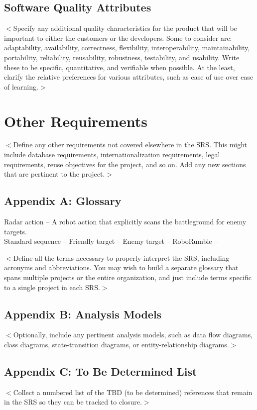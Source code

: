 \documentclass{scrreprt}
\begin{document}
\section{Software Quality Attributes}
$<$Specify any additional quality characteristics for the product that will be 
important to either the customers or the developers. Some to consider are: 
adaptability, availability, correctness, flexibility, interoperability, 
maintainability, portability, reliability, reusability, robustness, testability, 
and usability. Write these to be specific, quantitative, and verifiable when 
possible. At the least, clarify the relative preferences for various attributes, 
such as ease of use over ease of learning.$>$

\chapter{Other Requirements}
$<$Define any other requirements not covered elsewhere in the SRS. This might 
include database requirements, internationalization requirements, legal 
requirements, reuse objectives for the project, and so on. Add any new sections 
that are pertinent to the project.$>$

\section{Appendix A: Glossary}

Radar action -- A robot action that explicitly scans the battleground for enemy targets.\\
Standard sequence --
Friendly target --
Enemy target --
RoboRumble --

$<$Define all the terms necessary to properly interpret the SRS, including 
acronyms and abbreviations. You may wish to build a separate glossary that spans 
multiple projects or the entire organization, and just include terms specific to 
a single project in each SRS.$>$

\section{Appendix B: Analysis Models}
$<$Optionally, include any pertinent analysis models, such as data flow 
diagrams, class diagrams, state-transition diagrams, or entity-relationship 
diagrams.$>$

\section{Appendix C: To Be Determined List}
$<$Collect a numbered list of the TBD (to be determined) references that remain 
in the SRS so they can be tracked to closure.$>$
\end{document}
